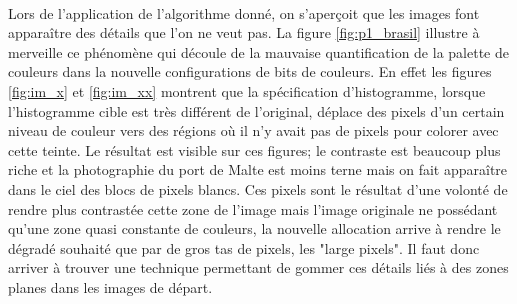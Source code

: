 \documentclass{article}
\begin{document}
\paragraph*{}
Lors de l'application de l'algorithme donné, on s'aperçoit que les images font apparaître des détails que l'on ne veut pas. La figure \ref{fig:p1_brasil} illustre à merveille ce phénomène qui découle de la mauvaise quantification de la palette de couleurs dans la nouvelle configurations de bits de couleurs. En effet les figures \ref{fig:im_x} et \ref{fig:im_xx} montrent que la spécification d'histogramme, lorsque l'histogramme cible est très différent de l'original, déplace des pixels d'un certain niveau de couleur vers des régions où il n'y avait pas de pixels pour colorer avec cette teinte. Le résultat est visible sur ces figures; le contraste est beaucoup plus riche et la photographie du port de Malte est moins terne mais on fait apparaître dans le ciel des blocs de pixels blancs. Ces pixels sont le résultat d'une volonté de rendre plus contrastée cette zone de l'image mais l'image originale ne possédant qu'une zone quasi constante de couleurs, la nouvelle allocation arrive à rendre le dégradé souhaité que par de gros tas de pixels, les "large pixels". Il faut donc arriver à trouver une technique permettant de gommer ces détails liés à des zones planes dans les images de départ.
\end{document}
